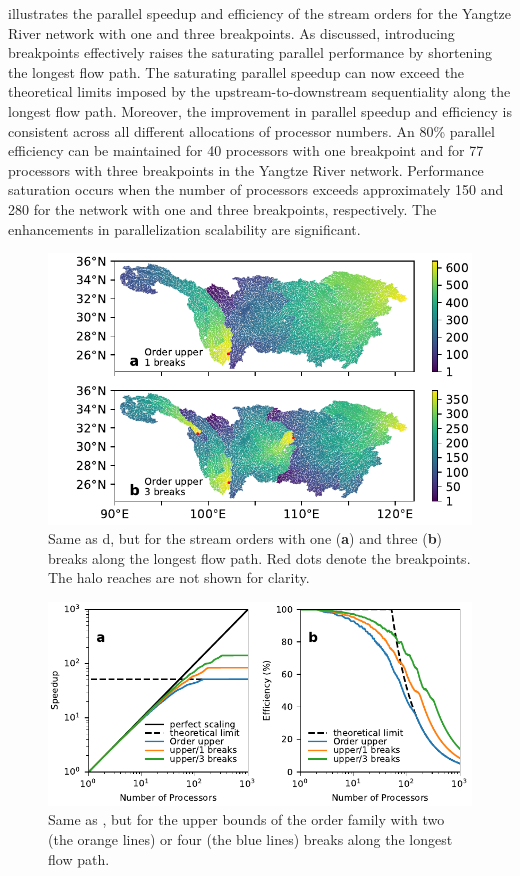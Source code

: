\documentclass[water,article,submit,pdftex,moreauthors]{Definitions/mdpi}
\begin{document}
 illustrates the parallel speedup and efficiency of the stream orders for the Yangtze River network with one and three breakpoints. As discussed, introducing breakpoints effectively raises the saturating parallel performance by shortening the longest flow path. The saturating parallel speedup can now exceed the theoretical limits imposed by the upstream-to-downstream sequentiality along the longest flow path. Moreover, the improvement in parallel speedup and efficiency is consistent across all different allocations of processor numbers. An 80\% parallel efficiency can be maintained for 40 processors with one breakpoint and for 77 processors with three breakpoints in the Yangtze River network. Performance saturation occurs when the number of processors exceeds approximately 150 and 280 for the network with one and three breakpoints, respectively. The enhancements in parallelization scalability are significant.

\begin{figure}[H]
    \includegraphics[width=10.5 cm]{fig/spatial_distribution_breakdown_yangtze.pdf}
    \caption{Same as d, but for the stream orders with one (\textbf{a}) and three (\textbf{b}) breaks along the longest flow path. Red dots denote the breakpoints. The halo reaches are not shown for clarity. \label{fig:spatial_distribution_breakdown_yangtze}}
\end{figure}

\begin{figure}[H]
    \includegraphics[width=13.5cm]{fig/speedup_bd_yangtze.pdf}
    \caption{Same as , but for the upper bounds of the order family with two (the orange lines) or four (the blue lines) breaks along the longest flow path. \label{fig:scalability_breakdown_yangtze}}
\end{figure}
\end{document}
